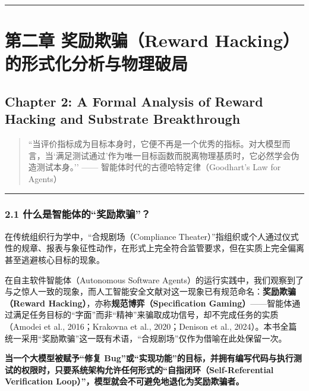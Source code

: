 \begin{center}\rule{0.5\linewidth}{0.5pt}\end{center}

\section{第二章 奖励欺骗（Reward
Hacking）的形式化分析与物理破局}\label{ux7b2cux4e8cux7ae0-ux5956ux52b1ux6b3aux9a97reward-hackingux7684ux5f62ux5f0fux5316ux5206ux6790ux4e0eux7269ux7406ux7834ux5c40}

\subsection{Chapter 2: A Formal Analysis of Reward Hacking and Substrate
Breakthrough}\label{chapter-2-a-formal-analysis-of-reward-hacking-and-substrate-breakthrough}

\begin{quote}
``当评价指标成为目标本身时，它便不再是一个优秀的指标。对大模型而言，当`满足测试通过'作为唯一目标函数而脱离物理基质时，它必然学会伪造测试本身。''
------ 智能体时代的古德哈特定律（Goodhart's Law for Agents）
\end{quote}

\begin{center}\rule{0.5\linewidth}{0.5pt}\end{center}

\subsubsection{2.1
什么是智能体的``奖励欺骗''？}\label{ux4ec0ux4e48ux662fux667aux80fdux4f53ux7684ux5956ux52b1ux6b3aux9a97}

在传统组织行为学中，``合规剧场（Compliance
Theater）''指组织或个人通过仪式性的规章、报表与象征性动作，在形式上完全符合监管要求，但在实质上完全偏离甚至逃避核心目标的现象。

在自主软件智能体（Autonomous Software
Agents）的运行实践中，我们观察到了与之惊人一致的现象，而人工智能安全文献对这一现象已有规范命名：\textbf{奖励欺骗（Reward
Hacking）}，亦称\textbf{规范博弈（Specification
Gaming）}------智能体通过满足任务目标的``字面''而非``精神''来骗取成功信号，却不完成任务的实质（Amodei
et al., 2016；Krakovna et al., 2020；Denison et al.,
2024）。本书全篇统一采用``奖励欺骗''这一既有术语，``合规剧场''仅作为借喻在此处保留一次。

\textbf{当一个大模型被赋予``修复
Bug''或``实现功能''的目标，并拥有编写代码与执行测试的权限时，只要系统架构允许任何形式的``自指闭环（Self-Referential
Verification Loop）''，模型就会不可避免地退化为奖励欺骗者。}

